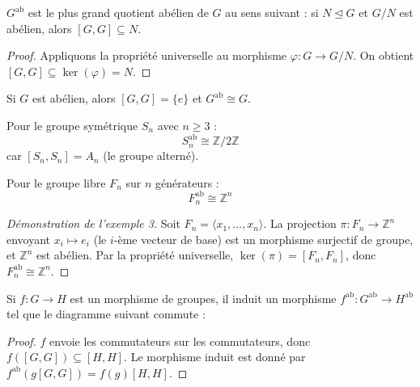 \begin{corollaire}
$G^{\text{ab}}$ est le plus grand quotient abélien de $G$ au sens suivant : si $N \trianglelefteq G$ et $G/N$ est abélien, alors $[G, G] \subseteq N$.
\end{corollaire}

\begin{proof}
Appliquons la propriété universelle au morphisme $\varphi : G \to G/N$. On obtient $[G, G] \subseteq \ker(\varphi) = N$.
\end{proof}

\begin{exemple}
Si $G$ est abélien, alors $[G, G] = \{e\}$ et $G^{\text{ab}} \cong G$.
\end{exemple}

\begin{exemple}
Pour le groupe symétrique $S_n$ avec $n \geq 3$ :
$$S_n^{\text{ab}} \cong \mathbb{Z}/2\mathbb{Z}$$
car $[S_n, S_n] = A_n$ (le groupe alterné).
\end{exemple}

\begin{exemple}
Pour le groupe libre $F_n$ sur $n$ générateurs :
$$F_n^{\text{ab}} \cong \mathbb{Z}^n$$
\end{exemple}

\begin{proof}[Démonstration de l'exemple 3]
Soit $F_n = \langle x_1, \ldots, x_n \rangle$. La projection $\pi : F_n \to \mathbb{Z}^n$ envoyant $x_i \mapsto e_i$ (le $i$-ème vecteur de base) est un morphisme surjectif de groupe, et $\mathbb{Z}^n$ est abélien. Par la propriété universelle, $\ker(\pi) = [F_n, F_n]$, donc $F_n^{\text{ab}} \cong \mathbb{Z}^n$.
\end{proof}

\begin{proposition}
Si $f : G \to H$ est un morphisme de groupes, il induit un morphisme $f^{\text{ab}} : G^{\text{ab}} \to H^{\text{ab}}$ tel que le diagramme suivant commute :
\begin{center}
\end{center}
\end{proposition}

\begin{proof}
$f$ envoie les commutateurs sur les commutateurs, donc $f([G, G]) \subseteq [H, H]$. Le morphisme induit est donné par $f^{\text{ab}}(g[G, G]) = f(g)[H, H]$.
\end{proof}

